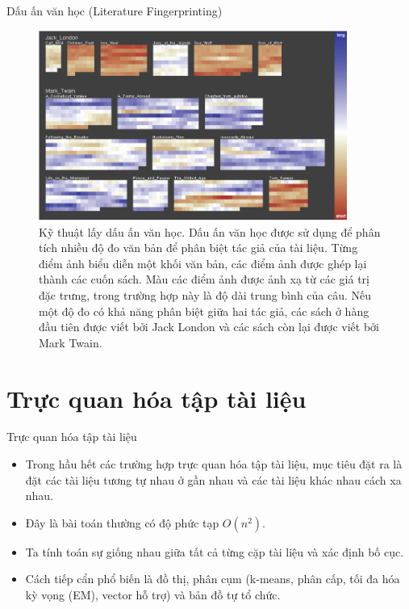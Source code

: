 \documentclass[10pt]{beamer}
\theoremstyle{remark}
\theoremstyle{definition}
\begin{document}
\begin{frame}{Dấu ấn văn học (Literature Fingerprinting)}
	\begin{figure}[h!]
        \centering
        \includegraphics[width=0.9\textwidth]{9.png}
        \caption{Kỹ thuật lấy dấu ấn văn học. Dấu ấn văn học được sử dụng để phân tích nhiều độ đo văn bản để phân biệt tác giả của tài liệu.
        Từng điểm ảnh biểu diễn một khối văn bản, các điểm ảnh được ghép lại thành các cuốn sách.
        Màu các điểm ảnh được ảnh xạ từ các giá trị đặc trưng, trong trường hợp này là độ dài trung bình của câu.
        Nếu một độ đo có khả năng phân biệt giữa hai tác giả, các sách ở hàng đầu tiên được viết bởi Jack London và các sách còn lại được viết bởi Mark Twain. \cite{222}}
        \label{fig:9}
    \end{figure}
\end{frame}


\section{Trực quan hóa tập tài liệu}

\begin{frame}{Trực quan hóa tập tài liệu}
	\begin{itemize}
		\item Trong hầu hết các trường hợp trực quan hóa tập tài liệu, mục tiêu đặt ra là đặt các tài liệu tương tự nhau ở gần nhau và các tài liệu khác nhau cách xa nhau.
		\item Đây là bài toán thường có độ phức tạp $O(n^2)$.
		\item Ta tính toán sự giống nhau giữa tất cả từng cặp tài liệu và xác định bố cục.
		\item Cách tiếp cẩn phổ biến là đồ thị, phân cụm (k-means, phân cấp, tối đa hóa kỳ vọng (EM), vector hỗ trợ) và bản đồ tự tổ chức.
	\end{itemize}
\end{frame}
\end{document}
